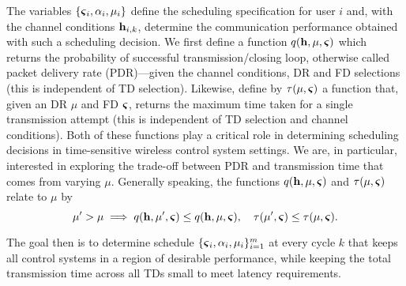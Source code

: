 The variables $\{\boldsymbol{\varsigma}_i, \alpha_i, \mu_i\}$ define the scheduling specification for user $i$ and, with the channel conditions ${\mathbf h}_{i,k}$, determine the communication performance obtained with such a scheduling decision. We first define a function  $q({\mathbf h},\mu,\boldsymbol{\varsigma})$ which returns the probability of successful transmission/closing loop, otherwise called packet delivery rate (PDR)---given the channel conditions, DR and FD selections (this is independent of TD selection). Likewise, define by $\tau(\mu,\boldsymbol{\varsigma})$ a function that, given an DR $\mu$ and FD $\boldsymbol{\varsigma}$, returns the maximum time taken for a single transmission attempt (this is independent of TD selection and channel conditions). Both of these functions play a critical role in determining scheduling decisions in time-sensitive wireless control system settings. We are, in particular, interested in exploring the trade-off between PDR and transmission time that comes from varying $\mu$. Generally speaking, the functions $q({\mathbf h},\mu,\boldsymbol{\varsigma})$ and $\tau(\mu,\boldsymbol{\varsigma})$ relate to $\mu$ by 
%
\begin{equation}
\mu' > \mu \implies q({\mathbf h},\mu',\boldsymbol{\varsigma}) \leq q({\mathbf h},\mu,\boldsymbol{\varsigma}), \quad \tau(\mu',\boldsymbol{\varsigma}) \leq \tau(\mu,\boldsymbol{\varsigma}).
\end{equation}
%

The goal then is to determine schedule $\{\boldsymbol{\varsigma}_i, \alpha_i, \mu_i\}_{i=1}^m$ at every cycle $k$ that keeps all control systems in a region of desirable performance, while keeping the total transmission time across all TDs small to meet latency requirements.


